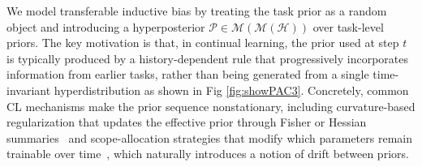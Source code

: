 \documentclass{article}
\theoremstyle{plain}
\theoremstyle{definition}
\theoremstyle{remark}
\begin{document}
We model transferable inductive bias by treating the task prior as a random object and introducing a hyperposterior $\mathcal P\in\mathcal M(\mathcal M(\mathcal H))$ over task-level priors. The key motivation is that, in continual learning, the prior used at step $t$ is typically produced by a history-dependent rule that progressively incorporates information from earlier tasks, rather than being generated from a single time-invariant hyperdistribution as shown in Fig \ref{fig:showPAC3}. 
Concretely, common CL mechanisms make the prior sequence nonstationary, including curvature-based regularization that updates the effective prior through Fisher or Hessian summaries~\citep{EWC2017,SI2017} and scope-allocation strategies that modify which parameters remain trainable over time~\citep{progressive2016,HAT2018,Piggyback2018,Supermasks2020,adapter2019,hu2022lora}, which naturally introduces a notion of drift between priors.
\end{document}
